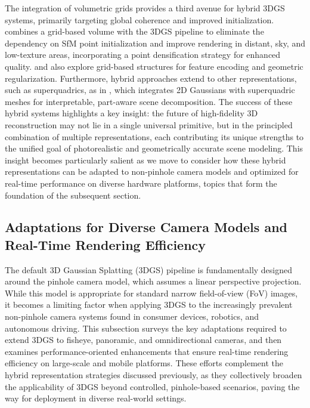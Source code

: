 \documentclass[11pt]{article}
\begin{document}
The integration of volumetric grids provides a third avenue for hybrid 3DGS systems, primarily targeting global coherence and improved initialization. \cite{ref52} combines a grid-based volume with the 3DGS pipeline to eliminate the dependency on SfM point initialization and improve rendering in distant, sky, and low-texture areas, incorporating a point densification strategy for enhanced quality. \cite{ref101} and \cite{ref92} also explore grid-based structures for feature encoding and geometric regularization. Furthermore, hybrid approaches extend to other representations, such as superquadrics, as in \cite{ref102}, which integrates 2D Gaussians with superquadric meshes for interpretable, part-aware scene decomposition. The success of these hybrid systems highlights a key insight: the future of high-fidelity 3D reconstruction may not lie in a single universal primitive, but in the principled combination of multiple representations, each contributing its unique strengths to the unified goal of photorealistic and geometrically accurate scene modeling. This insight becomes particularly salient as we move to consider how these hybrid representations can be adapted to non-pinhole camera models and optimized for real-time performance on diverse hardware platforms, topics that form the foundation of the subsequent section.

\subsection{Adaptations for Diverse Camera Models and Real-Time Rendering Efficiency}

The default 3D Gaussian Splatting (3DGS) pipeline is fundamentally designed around the pinhole camera model, which assumes a linear perspective projection. While this model is appropriate for standard narrow field-of-view (FoV) images, it becomes a limiting factor when applying 3DGS to the increasingly prevalent non-pinhole camera systems found in consumer devices, robotics, and autonomous driving. This subsection surveys the key adaptations required to extend 3DGS to fisheye, panoramic, and omnidirectional cameras, and then examines performance-oriented enhancements that ensure real-time rendering efficiency on large-scale and mobile platforms. These efforts complement the hybrid representation strategies discussed previously, as they collectively broaden the applicability of 3DGS beyond controlled, pinhole-based scenarios, paving the way for deployment in diverse real-world settings.
\end{document}
